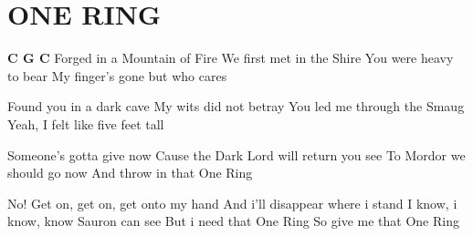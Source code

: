 \documentclass[../../../songbook.tex]{subfiles}
\begin{document}
\TabPositions{9cm} %
\section*{ONE RING}
{}
\vspace{0.5cm}
{\footnotesize
{\color{red}\textbf{C G C} }\newline
Forged in a Mountain of Fire	\newline
We first met in the Shire		\newline
You were heavy to bear		\newline
My finger's gone but who cares	\newline

Found you in a dark cave 				 \newline	
My wits did not betray				 \newline	
You led me through the Smaug				 \newline
Yeah, I felt like five feet tall			 \newline	

Someone's gotta give now		\newline
Cause the Dark Lord will return you see		\newline
To Mordor we should go now		\newline
And throw in that One Ring			\newline
	
\-\hspace{1cm} No! Get on, get on, get onto my hand	\newline
\-\hspace{1cm} And i'll disappear where i stand			\newline
\-\hspace{1cm} I know, i know, know Sauron can see			\newline
\-\hspace{1cm} But i need that One Ring				\newline
\-\hspace{1cm} So give me that One Ring				\newline

}
\end{document}
